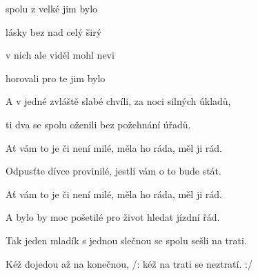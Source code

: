 

\zs
{} spolu z velké   jim bylo  

 lásky bez nad  celý širý 

 v nich ale viděl   mohl nevi

 horovali pro te  jim bylo  
\ks

\zs
A v jedné zvláště slabé chvíli, za noci silných úkladů,

ti dva se spolu oženili bez požehnání úřadů.

Ať vám to je či není milé, měla ho ráda, měl ji rád.

Odpusťte dívce provinilé, jestli vám o to bude stát.
\ks

\zs
Ať vám to je či není milé, měla ho ráda, měl ji rád.

A bylo by moc pošetilé pro život hledat jízdní řád.

Tak jeden mladík s jednou slečnou se spolu sešli na trati.

Kéž dojedou až na konečnou, /: kéž na trati se neztratí. :/
\ks

\kp
